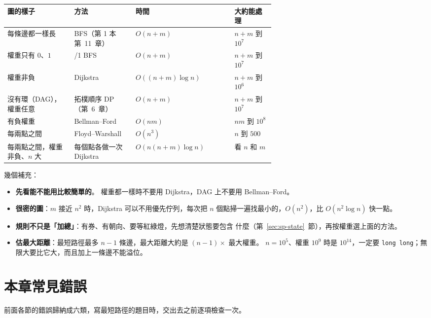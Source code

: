 \begin{center}
\begin{tabular}{>{\raggedright\arraybackslash}p{0.25\linewidth}>{\raggedright\arraybackslash}p{0.23\linewidth}l>{\raggedright\arraybackslash}p{0.15\linewidth}}
\toprule
圖的樣子 & 方法 & 時間 & 大約能處理 \\
\midrule
每條邊都一樣長 & BFS（第 1 本第~11~章） & $O(n + m)$ & $n + m$ 到 $10^7$ \\
權重只有 $0$、$1$ & 0/1 BFS & $O(n + m)$ & $n + m$ 到 $10^7$ \\
權重非負 & Dijkstra & $O((n + m) \log n)$ & $n + m$ 到 $10^6$ \\
沒有環（DAG），權重任意 & 拓樸順序 DP（第~6~章） & $O(n + m)$ & $n + m$ 到 $10^7$ \\
有負權重 & Bellman--Ford & $O(nm)$ & $nm$ 到 $10^8$ \\
每兩點之間 & Floyd--Warshall & $O(n^3)$ & $n$ 到 $500$ \\
每兩點之間，權重非負、$n$ 大 & 每個點各做一次 Dijkstra & $O(n(n + m) \log n)$ & 看 $n$ 和 $m$ \\
\bottomrule
\end{tabular}
\end{center}

幾個補充：

\begin{itemize}
\item \textbf{先看能不能用比較簡單的}。 權重都一樣時不要用 Dijkstra，DAG 上不要用
Bellman--Ford。
\item \textbf{很密的圖}：$m$ 接近 $n^2$ 時，Dijkstra 可以不用優先佇列，每次把
$n$ 個點掃一遍找最小的，$O(n^2)$，比 $O(n^2 \log n)$ 快一點。
\item \textbf{規則不只是「加總」}：有券、有朝向、要等紅綠燈，先想清楚狀態要包含
什麼（第~\ref{sec:sp-state}~節），再按權重選上面的方法。
\item \textbf{估最大距離}：最短路徑最多 $n - 1$ 條邊，最大距離大約是 $(n - 1)
\times$ 最大權重。 $n = 10^5$、權重 $10^9$ 時是 $10^{14}$，一定要
\texttt{long long}；無限大要比它大，而且加上一條邊不能溢位。
\end{itemize}

\section{本章常見錯誤}
\label{sec:sp-pitfalls}

前面各節的錯誤歸納成六類，寫最短路徑的題目時，交出去之前逐項檢查一次。

